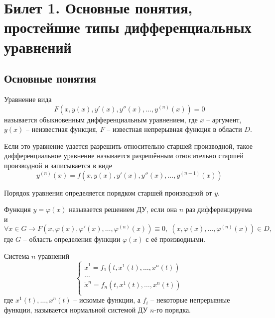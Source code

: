 \section{Билет 1. Основные понятия, простейшие типы дифференциальных уравнений}
\subsection{Основные понятия}

\begin{definition} 
    Уравнение вида \[F(x, y(x), y'(x), y''(x), \dots, y^{(n)}(x)) = 0\] называется обыкновенным дифференциальным уравнением,
    где $x$ -- аргумент, $y(x)$ -- неизвестная функция, $F$ -- известная непрерывная функция в области $D$.
\end{definition}

\begin{definition}
    Если это уравнение удается разрешить относительно старшей производной, такое дифференциальное
    уравнение называется разрешённым относительно старшей производной и записывается в виде
    \[y^{(n)}(x) = f(x, y(x), y'(x), y''(x), \dots, y^{(n - 1)}(x))\]
\end{definition}

Порядок уравнения определяется порядком старшей производной от $y$.

\begin{definition}
    Функция $y = \varphi(x)$ называется решением ДУ, если она $n$ раз дифференцируема и
    \[\forall x \in G \rightarrow F(x, \varphi(x), \varphi'(x), \dots, \varphi^{(n)}(x)) \equiv 0, \; (x, \varphi(x), \dots, \varphi^{(n)}(x)) \in D,\]
    где $G$ -- область определения функции $\varphi(x)$ с её производными.
\end{definition}

\begin{definition}
    Система $n$ уравнений
    \begin{equation}
        \begin{cases}
            \dot x^1 = f_1(t, x^1(t), \dots, x^n(t)) \\
            \dots \\
            \dot x^n = f_n(t, x^1(t), \dots, x^n(t)) \\
        \end{cases}
    \end{equation}
    где $x^1(t), \dots, x^n(t)$ -- искомые функции, а $f_i$ -- некоторые непрерывные функции, называется нормальной системой ДУ $n$-го порядка.
\end{definition}

